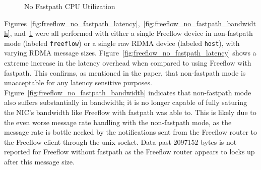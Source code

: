 \documentclass[12pt,titlepage]{article}
\begin{document}
\begin{figure}
	\centering
	\caption{No Fastpath CPU Utilization}%
	\label{fig:freeflow_no_fastpath_cpu}
\end{figure}

Figures~\ref{fig:freeflow_no_fastpath_latency},~\ref{fig:freeflow_no_fastpath_bandwidth}, and~\ref{fig:freeflow_no_fastpath_cpu} were all performed with either a single Freeflow device in non-fastpath mode (labeled \texttt{freeflow}) or a single raw RDMA device (labeled \texttt{host}), with varying RDMA message sizes.
Figure~\ref{fig:freeflow_no_fastpath_latency} shows a extreme increase in the latency overhead when compared to using Freeflow with fastpath.
This confirms, as mentioned in the paper, that non-fastpath mode is unacceptable for any latency sensitive purposes.
Figure~\ref{fig:freeflow_no_fastpath_bandwidth} indicates that non-fastpath mode also suffers substantially in bandwidth; 
it is no longer capable of fully saturing the NIC's bandwidth like Freeflow with fastpath was able to.
This is likely due to the even worse message rate handling with the non-fastpath mode, as the message rate is bottle necked by the notifications sent from the Freeflow router to the Freeflow client through the unix socket.
Data past 2097152 bytes is not reported for Freeflow without fastpath as the Freeflow router appears to locks up after this message size.
\end{document}
